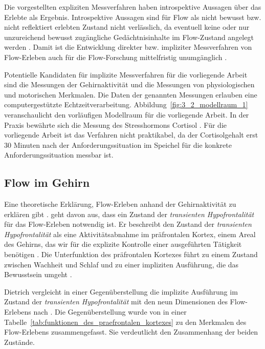 Die vorgestellten expliziten Messverfahren haben introspektive Aussagen über das Erlebte als Ergebnis. Introspektive Aussagen sind für Flow als nicht bewusst bzw. nicht reflektiert erlebten Zustand nicht verlässlich, da eventuell keine oder nur unzureichend bewusst zugängliche Gedächtnisinhalte im Flow-Zustand angelegt werden \citep[vgl.][S.~82]{Henk2014}. Damit ist die Entwicklung direkter bzw. impliziter Messverfahren von Flow-Erleben auch für die Flow-Forschung mittelfristig unumgänglich \citep[vgl.][S.~86]{Henk2014}.

Potentielle Kandidaten für implizite Messverfahren für die vorliegende Arbeit sind die Messungen der Gehirnaktivität und die Messungen von physiologischen und motorischen Merkmalen. Die Daten der genannten Messungen erlauben eine computergestützte Echtzeitverarbeitung. Abbildung~\ref{fig:3_2_modellraum_1} veranschaulicht den vorläufigen Modellraum für die vorliegende Arbeit. In der Praxis bewährte sich die Messung des Stresshormons Cortisol \citep{Keller2011, Peifer2014, Peifer2015}. Für die vorliegende Arbeit ist das Verfahren nicht praktikabel, da der Cortisolgehalt erst 30 Minuten nach der Anforderungssituation im Speichel für die konkrete Anforderungssituation messbar ist.

\subsection{Flow im Gehirn}

Eine theoretische Erklärung, Flow-Erleben anhand der Gehirnaktivität zu erklären gibt \citet{Dietrich2004}. \citet[S.~758f.]{Dietrich2004} geht davon aus, dass ein Zustand der \emph{transienten Hypofrontalität} für das Flow-Erleben notwendig ist. Er beschreibt den Zustand der \emph{transienten Hypofrontalität} als eine Aktivitätsabnahme im präfrontalen Kortex, einem Areal des Gehirns, das wir für die explizite Kontrolle einer ausgeführten Tätigkeit benötigen \citep[vgl.][]{Dietrich2003, Dietrich2004}. Die Unterfunktion des präfrontalen Kortexes führt zu einem Zustand zwischen Wachheit und Schlaf \citep[vgl.][S.~241]{Dietrich2003} und zu einer impliziten Ausführung, die das Bewusstsein umgeht \citep[vgl.][S.~753]{Dietrich2004}.

Dietrich \citep[][S.~757]{Dietrich2004} vergleicht in einer Gegenüberstellung die implizite Ausführung im Zustand der \emph{transienten Hypofrontalität} mit den neun Dimensionen des Flow-Erlebens nach \citet{Csikszentmihalyi1992}. Die Gegenüberstellung wurde von \citet{Henk2014} in einer Tabelle~\ref{tab:funktionen_des_praefrontalen_kortexes} zu den Merkmalen des Flow-Erlebens zusammengefasst. Sie verdeutlicht den Zusammenhang der beiden Zustände.

